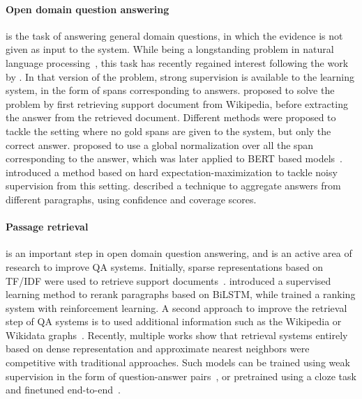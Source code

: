 \documentclass[11pt,a4paper]{article}
\begin{document}
\paragraph{Open domain question answering} is the task of answering general domain questions, in which the evidence is not given as input to the system.
While being a longstanding problem in natural language processing~\citep{voorhees1999trec}, this task has recently regained interest following the work by \citet{chen2017reading}.
In that version of the problem, strong supervision is available to the learning system, in the form of spans corresponding to answers.
\citet{chen2017reading} proposed to solve the problem by first retrieving support document from Wikipedia, before extracting the answer from the retrieved document.
Different methods were proposed to tackle the setting where no gold spans are given to the system, but only the correct answer.
\citet{clark2017simple} proposed to use a global normalization over all the span corresponding to the answer, which was later applied to BERT based models~\citep{wang2019multi}.
\citet{min2019discrete} introduced a method based on hard expectation-maximization to tackle noisy supervision from this setting.
\citet{wang2017evidence} described a technique to aggregate answers from different paragraphs, using confidence and coverage scores.

\paragraph{Passage retrieval} is an important step in open domain question answering, and is an active area of research to improve QA systems.
Initially, sparse representations based on TF/IDF were used to retrieve support documents~\citep{chen2017reading}.
\citet{lee2018ranking} introduced a supervised learning method to rerank paragraphs based on BiLSTM, while \citet{wang2018r} trained a ranking system with reinforcement learning.
A second approach to improve the retrieval step of QA systems is to used additional information such as the Wikipedia or Wikidata graphs~\citep{min2019knowledge,asai2019learning}.
Recently, multiple works show that retrieval systems entirely based on dense representation and approximate nearest neighbors were competitive with traditional approaches.
Such models can be trained using weak supervision in the form of question-answer pairs~\citep{karpukhin2020dense}, or pretrained using a cloze task and finetuned end-to-end~\citep{guu2020realm,lee2019latent}.
\end{document}
